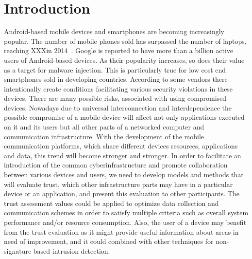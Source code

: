 \section{Introduction}

Android-based mobile devices and smartphones are becoming increasingly popular.  The number of mobile phones
sold has surpassed the number of laptops, reaching XXXin 2014~\cite{}.  Google is reported\cite{} to have more than
a billion active users of Android-based devices.  As their popularity increases, so does their value as
a target for malware injection.  
This is particularly true for low cost end smartphones sold in developing countries. According to \cite{}
some vendors there intentionally create conditions facilitating various security violations in these devices.
 There are many possible risks, associated with using compromised devices.  Nowadays due to universal interconnection and 
interdependence the 
possible compromise of a mobile device will affect not only applications executed on it and its users but all other parts 
of a networked computer and communication infrastructure.
With the development of the mobile communication platforms, which share different devices resources, applications and data, 
this trend will become stronger and stronger. 
In order to facilitate an introduction of the common cyberinfrastructure and promote collaboration between various devices 
and users, we need to develop models and methods that will evaluate trust, which other infrastructure parts may have in a 
particular device or an application, and present this evaluation to other participants. The trust assessment values could 
be applied to optimize data collection and communication schemes in order to satisfy multiple criteria such as overall 
system performance and/or resource consumption. Also, the user of a device may benefit from the trust evaluation as it might 
provide useful information about areas in need of improvement, and it could combined with other techniques for
 non-signature based intrusion detection.

